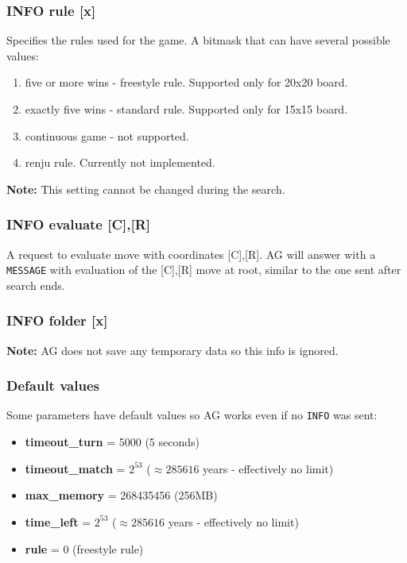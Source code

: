 \documentclass[12pt,a4paper]{article}
\begin{document}
\subsubsection{INFO rule [x]}
\label{cmd_info_rule}
Specifies the rules used for the game. A bitmask that can have several possible values:
\begin{enumerate}[leftmargin=7.5em]
	\item[\text{$[x]=0$}]{five or more wins - freestyle rule. Supported only for 20x20 board.}
	\item[\text{$[x]=1$}]{exactly five wins - standard rule. Supported only for 15x15 board.}
	\item[\text{$[x]=2$}]{continuous game - not supported.}
	\item[\text{$[x]=4$}]{renju rule. Currently not implemented.}
\end{enumerate}

\textbf{Note:} This setting cannot be changed during the search.

\subsubsection{INFO evaluate [C],[R]}
\label{cmd_info_evaluate}
A request to evaluate move with coordinates [C],[R]. AG will answer with a \texttt{MESSAGE} with evaluation of the [C],[R] move at root, similar to the one sent after search ends.

\subsubsection{INFO folder [x]}
\label{cmd_info_folder}
\textbf{Note:} AG does not save any temporary data so this info is ignored.

\subsubsection{Default values}
Some parameters have default values so AG works even if no \texttt{INFO} was sent:
\begin{itemize}
\item{\textbf{timeout{\_}turn } = 5000 (5 seconds)}
\item{\textbf{timeout{\_}match} = $2^{53}$ ($\approx 285616$ years - effectively no limit)}
\item{\textbf{max{\_}memory} = 268435456 (256MB)}
\item{\textbf{time{\_}left} = $2^{53}$ ($\approx 285616$ years - effectively no limit)}
\item{\textbf{rule} = 0 (freestyle rule)}
\end{itemize}
\end{document}
